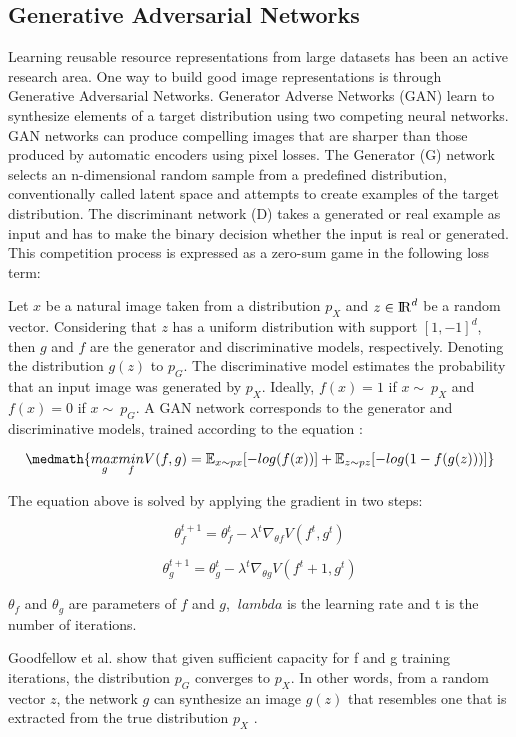 \subsection{Generative Adversarial Networks}

Learning reusable resource representations from large datasets has been an active research area. One way to build good image representations is through Generative Adversarial Networks. Generator Adverse Networks (GAN) learn to synthesize elements of a target distribution using two competing neural networks. GAN networks can produce compelling images that are sharper than those produced by automatic encoders using pixel losses. The Generator (G) network selects an n-dimensional random sample from a predefined distribution, conventionally called latent space and attempts to create examples of the target distribution. The discriminant network (D) takes a generated or real example as input and has to make the binary decision whether the input is real or generated. This competition process is expressed as a zero-sum game in the following loss term:

Let $x$ be a natural image taken from a distribution $ p_X$ and $ z \in {\rm I\!R}^d $ be a random vector. Considering that $z$ has a uniform distribution with support $[1,-1]^d$, then $g$ and $f$ are the generator and discriminative models, respectively. Denoting the distribution $g(z)$ to $ p_G $. The discriminative model estimates the probability that an input image was generated by $ p_X $. Ideally, $f(x)=1$  if $x  \sim\  p_X$ and $f (x) = 0$ if $ x \sim\ p_G $. A GAN network corresponds to the generator and discriminative models, trained according to the equation \cite{Liu2016}:


\begin{equation}
\medmath{ \underset{g}{max} \underset{f}{min} V(f,g)= \mathbb{E}_{x \sim px} [-log(f(x))]+\mathbb{E}_{z \sim pz}[-log(1-f(g(z)))]} \nonumber 
\end{equation}

The equation above is solved by applying the gradient in two steps:

\begin{equation}
\theta^{t+1}_{f} = \theta^{t}_{f} -\lambda^t \nabla_{\theta f} V (f^t, g^t) \nonumber
\end{equation}

\begin{equation}
\theta^{t+1}_{g} = \theta^{t}_{g} -\lambda^t \nabla_{\theta g} V (f^t+1, g^t) \nonumber
\end{equation}


$ \theta_f $ and $ \theta_g $ are parameters of $f$ and $g$, $ \ lambda $ is the learning rate and t is the number of iterations.

Goodfellow et al. show that given sufficient capacity for f and g training iterations, the distribution $ p_G $ converges to $ p_X $. In other words, from a random vector $z$, the network $g$ can synthesize an image $g (z)$ that resembles one that is extracted from the true distribution $ p_X $ \cite{Goodfellow2014}.